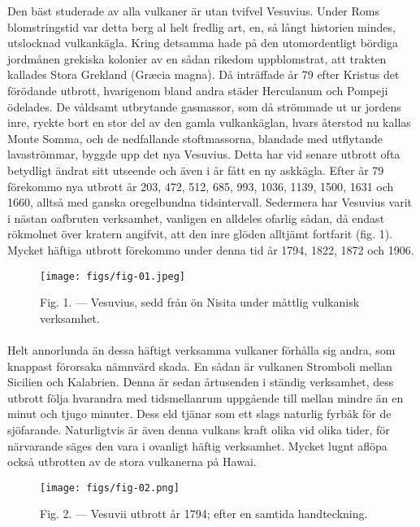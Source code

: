 \documentclass[a4paper, 12pt, oneside, swedish]{article}
\begin{document}
Den bäst studerade av alla vulkaner är utan tvifvel Vesuvius. Under Roms blomstringstid var detta berg al helt fredlig art, en, så långt historien mindes, utslocknad vulkankägla. Kring detsamma hade på den utomordentligt bördiga jordmånen grekiska kolonier av en sådan rikedom uppblomstrat, att trakten kallades Stora Grekland (Græcia magna). Då inträffade år 79 efter Kristus det förödande utbrott, hvarigenom bland andra städer Herculanum och Pompeji ödelades. De våldsamt utbrytande gasmassor, som då strömmade ut ur jordens inre, ryckte bort en stor del av den gamla vulkankäglan, hvars återstod nu kallas Monte Somma, och de nedfallande stoftmassorna, blandade med utflytande lavaströmmar, byggde upp det nya Vesuvius. Detta har vid senare utbrott ofta betydligt ändrat sitt utseende och även i år fått en ny askkägla. Efter år 79 förekommo nya utbrott år 203, 472, 512, 685, 993, 1036, 1139, 1500, 1631 och 1660, alltså med ganska oregelbundna tidsintervall. Sedermera har Vesuvius varit i nästan oafbruten verksamhet, vanligen en alldeles ofarlig sådan, då endast rökmolnet över kratern angifvit, att den inre glöden alltjämt fortfarit (fig. 1). Mycket häftiga utbrott förekommo under denna tid år 1794, 1822, 1872 och 1906.

\begin{figure}[H]
\centering
\texttt{[image: figs/fig-01.jpeg]}
\caption{Fig. 1. --- Vesuvius, sedd från ön Nisita under måttlig vulkanisk verksamhet.}
\end{figure}
\paragraph{}
Helt annorlunda än dessa häftigt verksamma vulkaner förhålla sig andra, som knappast förorsaka nämnvärd skada. En sådan är vulkanen Stromboli mellan Sicilien och Kalabrien. Denna är sedan årtusenden i ständig verksamhet, dess utbrott följa hvarandra med tidsmellanrum uppgående till mellan mindre än en minut och tjugo minuter. Dess eld tjänar som ett slags naturlig fyrbåk för de sjöfarande. Naturligtvis är även denna vulkans kraft olika vid olika tider, för närvarande säges den vara i ovanligt häftig verksamhet. Mycket lugnt aflöpa också utbrotten av de stora vulkanerna på Hawai.

\begin{figure}[H]
\centering
\texttt{[image: figs/fig-02.png]}
\caption{Fig. 2. --- Vesuvii utbrott år 1794; efter en samtida handteckning.}
\end{figure}
\end{document}
